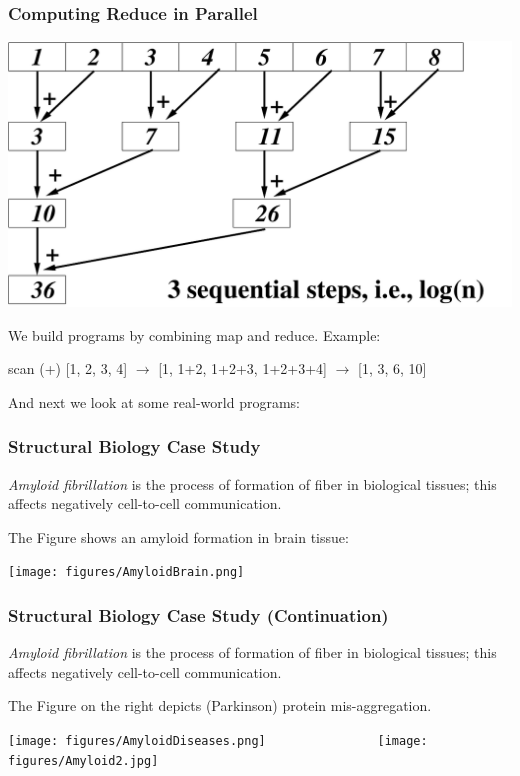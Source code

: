 \documentclass{beamer}
\newcommand{\emp}[1]{\textcolor{DikuRed}{ #1}}
\begin{document}
\begin{frame}
  \frametitle{Computing Reduce in Parallel}

\begin{center} 
        \includegraphics[height=28ex]{figures/ReduceEg.pdf} 
\end{center} 

We build programs by combining \alert{map} and \alert{reduce}. Example: \smallskip

\emp{scan} (+) [1, 2, 3, 4] $\rightarrow$ [1, 1+2, 1+2+3, 1+2+3+4] $\rightarrow$ [1, 3, 6, 10]\bigskip

And next we look at some real-world programs:
\end{frame}


\begin{frame}
  \frametitle{Structural Biology Case Study}
\bigskip
    {\em \emp{Amyloid fibrillation}} is the process of formation of fiber in biological tissues; this affects negatively cell-to-cell communication.

\bigskip

    The Figure shows an amyloid formation in brain tissue:

    \begin{center} 
        \texttt{[image: figures/AmyloidBrain.png]} 
    \end{center} 
 
\end{frame}

\begin{frame}
  \frametitle{Structural Biology Case Study (Continuation)}
\bigskip
    {\em \emp{Amyloid fibrillation}} is the process of formation of fiber in biological tissues; this affects negatively cell-to-cell communication.

\bigskip

The Figure on the right depicts (Parkinson) protein mis-aggregation. %

\begin{center} 
    \texttt{[image: figures/AmyloidDiseases.png]} 
$\mbox{ }\mbox{ }\mbox{ }\mbox{ }\mbox{ }\mbox{ }\mbox{ }\mbox{ }\mbox{ }\mbox{ }\mbox{ }$
    \texttt{[image: figures/Amyloid2.jpg]} 
\end{center} 
 
\end{frame}
\end{document}
